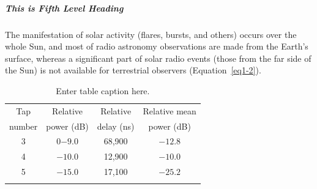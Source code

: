 \subparagraph{This is Fifth Level Heading}

\lipsum[6]

The manifestation of solar activity (flares, bursts, and others) occurs over the whole Sun, and most of radio astronomy observations are made from the Earth's surface, whereas a significant part of solar radio events (those from the far side of the Sun) is not available for terrestrial observers (Equation~\ref{eq1-2}).

\begin{table}
\caption{Enter table caption here.\label{tab1-2}}{%
\begin{tabular}{@{}cccc@{}}
\toprule
Tap     &Relative   &Relative   &Relative mean\\
number  &power (dB) &delay (ns) &power (dB)\\
\midrule
3 &0$-9.0$  &68,900\footnotemark[1] &$-12.8$\\
4 &$-10.0$ &12,900\footnotemark[2] &$-10.0$\\
5 &$-15.0$ &17,100 &$-25.2$\\
\botrule
\end{tabular}}{
}
\end{table}

\backmatter


%

